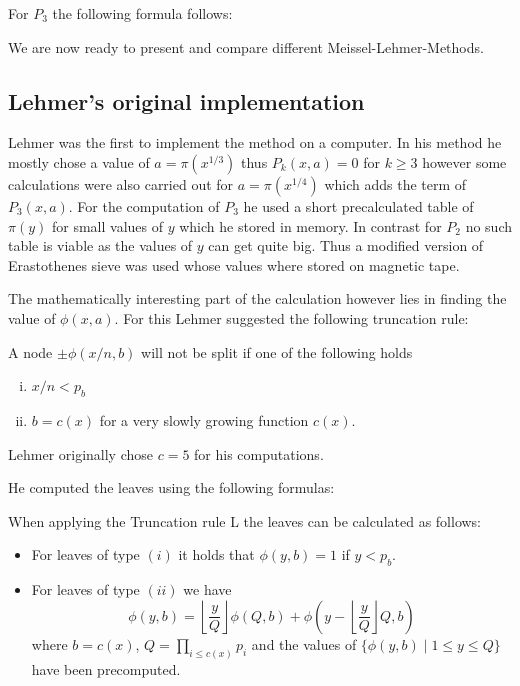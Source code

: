 For $P_3$ the following formula follows:


We are now ready to present and compare different Meissel-Lehmer-Methods.

\subsection{Lehmer's original implementation}
Lehmer was the first to implement the method on a computer.
In his method he mostly chose a value of $a = \pi(x^{1 / 3})$ thus $P_{k}(x,a) = 0$ for $k \geq 3$ 
however some calculations were also carried out for $a = \pi(x^{1 / 4})$ which adds the term of $P_{3}(x,a)$.
For the computation of $P_{3}$ he used a short precalculated table of $\pi(y)$ for small values of $y$ which he stored in memory.
In contrast for $P_2$ no such table is viable as the values of $y$ can get quite big. Thus 
a modified version of Erastothenes sieve was used whose values where stored on magnetic tape.

The mathematically interesting part of the calculation however lies in finding the value of $\phi(x,a)$.
For this Lehmer suggested the following truncation rule:

\begin{definition}
	A node $\pm \phi(x / n , b)$ will not be split if one of the following holds
	\begin{enumerate}[(i)]
		\item $x / n  < p_{b}$
		\item $b = c(x)$ for a very slowly growing function $c(x)$.
	\end{enumerate}
\end{definition}
Lehmer originally chose $c = 5$ for his computations.

He computed the leaves using the following formulas:
\begin{lemma}
	When applying the Truncation rule L the leaves can be calculated as follows:
	\begin{itemize}
		\item For leaves of type $(i)$ it holds that $\phi(y,b) = 1$ if $y < p_{b}$.
		\item For leaves of type $(ii)$ we have
			\[
				\phi(y,b) = \left\lfloor \frac{y}{Q} \right\rfloor \phi(Q,b) + \phi(y-\left\lfloor \frac{y}{Q} \right\rfloor Q,b)
			\] 
			where $b = c( x)$, $Q = \prod_{i \leq c(x)} p_{i}$ and the values of $\{\phi(y,b) \mid 1 \leq y \leq Q\} $ have been precomputed.
	\end{itemize}
\end{lemma}

